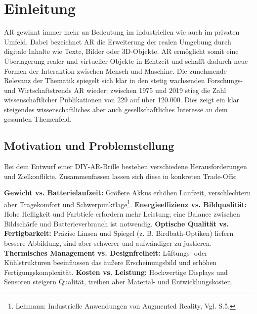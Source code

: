 
\chapter{Einleitung}
\ac{AR} gewinnt immer mehr an Bedeutung im industriellen wie auch im privaten Umfeld. Dabei bezeichnet \ac{AR} die Erweiterung der realen Umgebung durch digitale Inhalte wie Texte, Bilder oder 3D-Objekte\autocite[Vgl. S.28 f.]{thomasSmartGlassesAugmented2020}. \ac{AR} ermöglicht somit eine Überlagerung realer und virtueller Objekte in Echtzeit und schafft dadurch neue Formen der Interaktion zwischen Mensch und Maschine\autocite[Vgl. S.28 f.]{thomasSmartGlassesAugmented2020}.\newline
Die zunehmende Relevanz der Thematik spiegelt sich klar in den stetig wachsenden Forschungs- und Wirtschaftstrends \ac{AR} wieder: zwischen 1975 und 2019 stieg die Zahl wissenschaftlicher Publikationen von 229 auf über 120.000\autocite[Vgl. S.20]{thomasSmartGlassesAugmented2020}. Dies zeigt ein klar steigendes wissenschaftliches aber auch gesellschaftliches Interesse an dem gesamten Themenfeld.\newline

\section{Motivation und Problemstellung}
Bei dem Entwurf einer \ac{DIY}-\ac{AR}-Brille bestehen verschiedene Herausforderungen und Zielkonflikte. Zusammenfassen lassen sich diese in konkreten Trade-Offs:

\textbf{Gewicht vs. Batterielaufzeit:} Größere Akkus erhöhen Laufzeit, verschlechtern aber Tragekomfort und Schwerpunktlage\footnote{Lehmann: Industrielle Anwendungen von Augmented Reality, Vgl. S.5.}.\newline
\textbf{Energieeffizienz vs. Bildqualität:} Hohe Helligkeit und Farbtiefe erfordern mehr Leistung; eine Balance zwischen Bildschärfe und Batterieverbrauch ist notwendig\autocite[Vgl. S.1 ff.]{qianPowerConsumptionLight2025}.\newline
\textbf{Optische Qualität vs. Fertigbarkeit:} Präzise Linsen und Spiegel (z. B. Birdbath-Optiken) liefern bessere Abbildung, sind aber schwerer und aufwändiger zu justieren\autocite[Vgl. S.4 ff.]{zhang2024review}.\newline
\textbf{Thermisches Management vs. Designfreiheit:} Lüftungs- oder Kühlstrukturen beeinflussen das äußere Erscheinungsbild und erhöhen Fertigungskomplexität\autocite[Vgl. S.20]{lehmannErmittlungGeeigneterIndustrieller2023}.\newline
\textbf{Kosten vs. Leistung:} Hochwertige Displays und Sensoren steigern Qualität, treiben aber Material- und Entwicklungskosten\autocite[Vgl. S.2 f.]{linAugmentedRealitySmart2025}.

